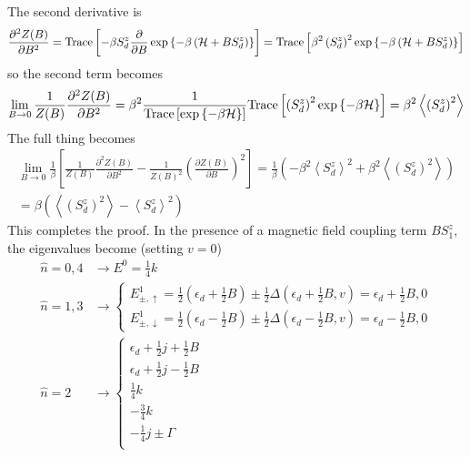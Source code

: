 \documentclass[12pt,twoside]{article}
\numberwithin{equation}{section}
\begin{document}
The second derivative is
\begin{equation}\begin{aligned}
	\frac{\partial^2{Z(B)}}{\partial{B^2}} = \text{Trace}\left[-\beta S_d^z  \frac{\partial{}}{\partial{B}}\exp\left\{-\beta \left( \mathcal{H} + BS_d^z \right) \right\}\right] = \text{Trace}\left[\beta^2 \left(S_d^z\right)^2 \exp\left\{-\beta \left( \mathcal{H} + BS_d^z \right) \right\}\right]
\end{aligned}\end{equation}
so the second term becomes
\begin{equation}\begin{aligned}
	\lim_{B \to 0}\frac{1}{Z(B)} \frac{\partial^2{Z(B)}}{\partial{B^2}} = \beta^2 \frac{1}{\text{Trace}\left[\exp\left\{-\beta \mathcal{H}\right\}\right]}\text{Trace}\left[\left(S_d^z\right)^2 \exp\left\{-\beta \mathcal{H}\right\}\right] = \beta^2 \left<\left(S_d^z\right)^2 \right>
\end{aligned}\end{equation}
The full thing becomes
\begin{equation}\begin{aligned}
	\lim_{B \to 0}\frac{1}{\beta}\left[\frac{1}{Z(B)} \frac{\partial^2{Z(B)}}{\partial{B^2}}-\frac{1}{Z(B)^2} \left(\frac{\partial{Z(B)}}{\partial{B}}\right)^2\right] = \frac{1}{\beta}\left(-\beta^2 \left<S_d^z\right>^2 + \beta^2 \left<\left(S_d^z\right)^2 \right>\right) \\
	= \beta \left(\left<\left(S_d^z\right)^2\right> - \left<S_d^z\right>^2\right) 
\end{aligned}\end{equation}
This completes the proof. 
\pb In the presence of a magnetic field coupling term \(B S^z_1\), the eigenvalues become (setting \(v = 0\))
\begin{equation}\begin{aligned}
\hat n=0,4 &\rightarrow E^0 = \frac{1}{4}k\\
\hat n=1,3 &\rightarrow \begin{cases}
	E^1_{\pm, \uparrow} = \frac{1}{2} \left(\epsilon_d + \frac{1}{2}B\right) \pm \frac{1}{2}\Delta\left(\epsilon_d + \frac{1}{2}B, v\right)  = \epsilon_d + \frac{1}{2}B, 0\\ 
	E^1_{\pm, \downarrow} = \frac{1}{2} \left(\epsilon_d - \frac{1}{2}B\right) \pm \frac{1}{2}\Delta\left(\epsilon_d - \frac{1}{2}B, v\right)  = \epsilon_d -\frac{1}{2}B, 0
	\end{cases}\\
	\hat n=2 &\rightarrow \begin{cases}
	\epsilon_d + \frac{1}{2}j + \frac{1}{2}B\\
	\epsilon_d + \frac{1}{2}j - \frac{1}{2}B\\
	\frac{1}{4}k \\
	-\frac{3}{4}k \\
	-\frac{1}{4}j \pm  \Gamma \\
\end{cases}
\end{aligned}\end{equation}
\end{document}
